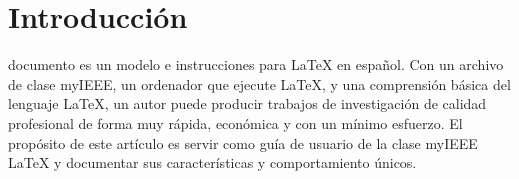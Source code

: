 \section{Introducción} \label{sec:introduccion}

 documento es un modelo e instrucciones para {\LaTeX} en español. Con un archivo de clase myIEEE, un ordenador que ejecute {\LaTeX}, y una comprensión básica del lenguaje {\LaTeX}, un autor puede producir trabajos de investigación de calidad profesional de forma muy rápida, económica y con un mínimo esfuerzo. El propósito de este artículo es servir como guía de usuario de la clase myIEEE {\LaTeX} y documentar sus características y comportamiento únicos. \par
